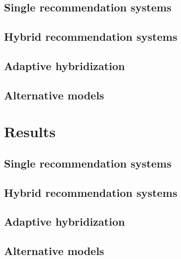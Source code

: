 \documentclass[10pt]{reportMaster}
\begin{document}
\section{Single recommendation systems}

\section{Hybrid recommendation systems}

\section{Adaptive hybridization}

\section{Alternative models}







\chapter{Results}

\section{Single recommendation systems}

\section{Hybrid recommendation systems}

\section{Adaptive hybridization}

\section{Alternative models}
\end{document}
